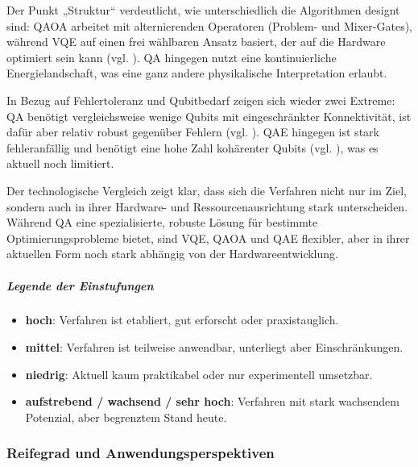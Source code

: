 Der Punkt „Struktur“ verdeutlicht, wie unterschiedlich die Algorithmen designt sind: QAOA arbeitet mit alternierenden Operatoren (Problem- und Mixer-Gates), während VQE auf einen frei wählbaren Ansatz basiert, der auf die Hardware optimiert sein kann (vgl. \cite{brandhofer_benchmarking_2022}). QA hingegen nutzt eine kontinuierliche Energielandschaft, was eine ganz andere physikalische Interpretation erlaubt.

In Bezug auf Fehlertoleranz und Qubitbedarf zeigen sich wieder zwei Extreme: QA benötigt vergleichsweise wenige Qubits mit eingeschränkter Konnektivität, ist dafür aber relativ robust gegenüber Fehlern (vgl. \cite{sakuler_real-world_2025}). QAE hingegen ist stark fehleranfällig und benötigt eine hohe Zahl kohärenter Qubits (vgl. \cite{bouland_prospects_2020}), was es aktuell noch limitiert.

Der technologische Vergleich zeigt klar, dass sich die Verfahren nicht nur im Ziel, sondern auch in ihrer Hardware- und Ressourcenausrichtung stark unterscheiden. Während QA eine spezialisierte, robuste Lösung für bestimmte Optimierungsprobleme bietet, sind VQE, QAOA und QAE flexibler, aber in ihrer aktuellen Form noch stark abhängig von der Hardwareentwicklung.

\subparagraph{Legende der Einstufungen}

\begin{itemize}
    \item \textbf{hoch}: Verfahren ist etabliert, gut erforscht oder praxistauglich.
    \item \textbf{mittel}: Verfahren ist teilweise anwendbar, unterliegt aber Einschränkungen.
    \item \textbf{niedrig}: Aktuell kaum praktikabel oder nur experimentell umsetzbar.
    \item \textbf{aufstrebend / wachsend / sehr hoch}: Verfahren mit stark wachsendem Potenzial, aber begrenztem Stand heute.
\end{itemize}

\subsubsection*{Reifegrad und Anwendungsperspektiven}

